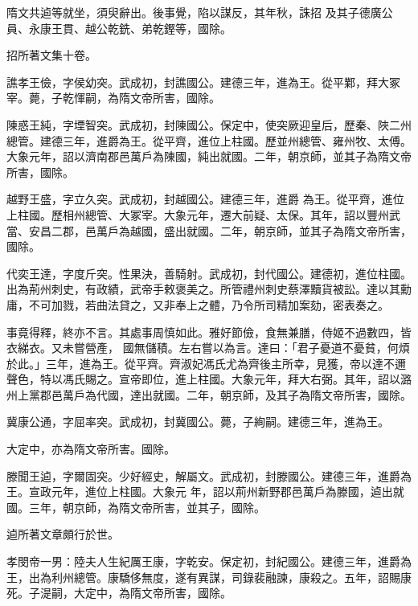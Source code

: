 \begin{pinyinscope}
 隋文共逌等就坐，須臾辭出。後事覺，陷以謀反，其年秋，誅招
 及其子德廣公員、永康王貫、越公乾銑、弟乾鏗等，國除。



 招所著文集十卷。



 譙孝王儉，字侯幼突。武成初，封譙國公。建德三年，進為王。從平鄴，拜大冢宰。薨，子乾惲嗣，為隋文帝所害，國除。



 陳惑王純，字堙智突。武成初，封陳國公。保定中，使突厥迎皇后，歷秦、陜二州總管。建德三年，進爵為王。從平齊，進位上柱國。歷並州總管、雍州牧、太傅。大象元年，詔以濟南郡邑萬戶為陳國，純出就國。二年，朝京師，並其子為隋文帝所害，國除。



 越野王盛，字立久突。武成初，封越國公。建德三年，進爵
 為王。從平齊，進位上柱國。歷相州總管、大冢宰。大象元年，遷大前疑、太保。其年，詔以豐州武當、安昌二郡，邑萬戶為越國，盛出就國。二年，朝京師，並其子為隋文帝所害，國除。



 代奕王達，字度斤突。性果決，善騎射。武成初，封代國公。建德初，進位柱國。出為荊州刺史，有政績，武帝手敕褒美之。所管禮州刺史蔡澤黷貨被訟。達以其勳庸，不可加戮，若曲法貸之，又非奉上之體，乃令所司精加案劾，密表奏之。



 事竟得釋，終亦不言。其處事周慎如此。雅好節儉，食無兼膳，侍姬不過數四，皆衣綈衣。又未嘗營產，
 國無儲積。左右嘗以為言。達曰：「君子憂道不憂貧，何煩於此。」三年，進為王。從平齊。齊淑妃馮氏尤為齊後主所幸，見獲，帝以達不邇聲色，特以馮氏賜之。宣帝即位，進上柱國。大象元年，拜大右弼。其年，詔以潞州上黨郡邑萬戶為代國，達出就國。二年，朝京師，及其子為隋文帝所害，國除。



 冀康公通，字屈率突。武成初，封冀國公。薨，子絢嗣。建德三年，進為王。



 大定中，亦為隋文帝所害。國除。



 滕聞王逌，字爾固突。少好經史，解屬文。武成初，封滕國公。建德三年，進爵為王。宣政元年，進位上柱國。大象元
 年，詔以荊州新野郡邑萬戶為滕國，逌出就國。三年，朝京師，為隋文帝所害，並其子，國除。



 逌所著文章頗行於世。



 孝閔帝一男：陸夫人生紀厲王康，字乾安。保定初，封紀國公。建德三年，進爵為王，出為利州總管。康驕侈無度，遂有異謀，司錄裴融諫，康殺之。五年，詔賜康死。子湜嗣，大定中，為隋文帝所害，國除。




\end{pinyinscope}
